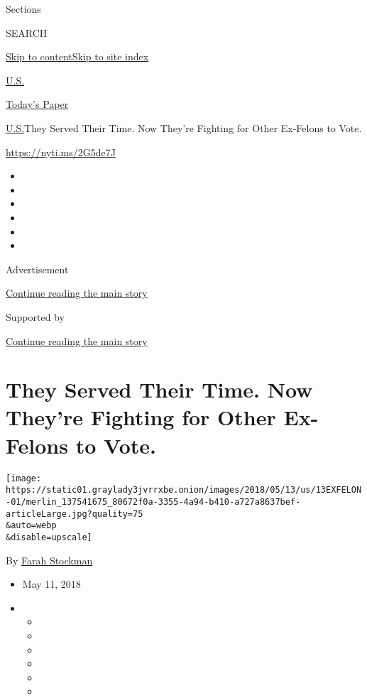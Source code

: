 Sections

SEARCH

\protect\hyperlink{site-content}{Skip to
content}\protect\hyperlink{site-index}{Skip to site index}

\href{https://www.nytimes3xbfgragh.onion/section/us}{U.S.}

\href{https://myaccount.nytimes3xbfgragh.onion/auth/login?response_type=cookie\&client_id=vi}{}

\href{https://www.nytimes3xbfgragh.onion/section/todayspaper}{Today's
Paper}

\href{/section/us}{U.S.}\textbar{}They Served Their Time. Now They're
Fighting for Other Ex-Felons to Vote.

\url{https://nyti.ms/2G5de7J}

\begin{itemize}
\item
\item
\item
\item
\item
\item
\end{itemize}

Advertisement

\protect\hyperlink{after-top}{Continue reading the main story}

Supported by

\protect\hyperlink{after-sponsor}{Continue reading the main story}

\hypertarget{they-served-their-time-now-theyre-fighting-for-other-ex-felons-to-vote}{%
\section{They Served Their Time. Now They're Fighting for Other
Ex-Felons to
Vote.}\label{they-served-their-time-now-theyre-fighting-for-other-ex-felons-to-vote}}

\texttt{[image: https://static01.graylady3jvrrxbe.onion/images/2018/05/13/us/13EXFELON-01/merlin\_137541675\_80672f0a-3355-4a94-b410-a727a8637bef-articleLarge.jpg?quality=75\\\&auto=webp\\\&disable=upscale]}

By \href{https://www.nytimes3xbfgragh.onion/by/farah-stockman}{Farah
Stockman}

\begin{itemize}
\item
  May 11, 2018
\item
  \begin{itemize}
  \item
  \item
  \item
  \item
  \item
  \item
  \end{itemize}
\end{itemize}

